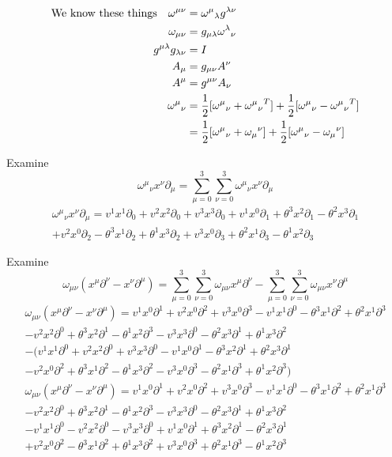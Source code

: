 \documentclass{article}
\begin{document}
\begin{align*}
	\qq*{We know these things}\omega^{\mu\nu}&={\omega^\mu}_\lambda g^{\lambda\nu}\\
	\omega_{\mu\nu}&= g_{\mu\lambda} {\omega^\lambda}_\nu\\
	g^{\mu\lambda}g_{\lambda\nu}&= I\\
	A_\mu&=g_{\mu\nu}A^\nu\\
	A^\mu&=g^{\mu\nu}A_\nu\\
	{\omega^\mu}_\nu&=\frac{1}{2}[{\omega^\mu}_\nu+{{\omega^\mu}_\nu}^T]+\frac{1}{2}[{\omega^\mu}_\nu-{{\omega^\mu}_\nu}^T]\\
	&=\frac{1}{2}[{\omega^\mu}_\nu+{\omega_\mu}^\nu]+\frac{1}{2}[{\omega^\mu}_\nu-{\omega_\mu}^\nu]
\end{align*}




Examine \[{\omega^\mu}_\nu x^\nu \partial_\mu=\sum^3_{\mu=0}\sum^3_{\nu=0}{\omega^\mu}_\nu x^\nu \partial_\mu\]
\begin{multline*}
{\omega^\mu}_\nu x^\nu \partial_\mu=
v^1 x^1 \partial_0+v^2 x^2 \partial_0+v^3 x^3 \partial_0+
v^1 x^0 \partial_1+\theta^3 x^2 \partial_1-\theta^2 x^3 \partial_1\\+ 
v^2 x^0 \partial_2-\theta^3 x^1 \partial_2+\theta^1 x^3 \partial_2+
v^3 x^0 \partial_3+\theta^2 x^1 \partial_3-\theta^1 x^2 \partial_3
\end{multline*}

Examine \[\omega_{\mu\nu} (x^\mu \partial^\nu-x^\nu \partial^\mu)=\sum^3_{\mu=0}\sum^3_{\nu=0}\omega_{\mu\nu} x^\mu \partial^\nu-\sum^3_{\mu=0}\sum^3_{\nu=0}\omega_{\mu\nu} x^\nu \partial^\mu\]
\begin{multline*}
\omega_{\mu\nu} (x^\mu \partial^\nu-x^\nu \partial^\mu)=
v^1 x^0 \partial^1+v^2 x^0 \partial^2+v^3 x^0 \partial^3
-v^1 x^1 \partial^0-\theta^3 x^1 \partial^2+\theta^2 x^1 \partial^3\\ 
-v^2 x^2 \partial^0+\theta^3 x^2 \partial^1-\theta^1 x^2 \partial^3
-v^3 x^3 \partial^0-\theta^2 x^3 \partial^1+\theta^1 x^3 \partial^2\\-
(v^1 x^1 \partial^0+v^2 x^2 \partial^0+v^3 x^3 \partial^0
-v^1 x^0 \partial^1-\theta^3 x^2 \partial^1+\theta^2 x^3 \partial^1\\ 
-v^2 x^0 \partial^2+\theta^3 x^1 \partial^2-\theta^1 x^3 \partial^2
-v^3 x^0 \partial^3-\theta^2 x^1 \partial^3+\theta^1 x^2 \partial^3)\end{multline*}
\begin{multline*}
\omega_{\mu\nu} (x^\mu \partial^\nu-x^\nu \partial^\mu)=
v^1 x^0 \partial^1+v^2 x^0 \partial^2+v^3 x^0 \partial^3
-v^1 x^1 \partial^0-\theta^3 x^1 \partial^2+\theta^2 x^1 \partial^3\\ 
-v^2 x^2 \partial^0+\theta^3 x^2 \partial^1-\theta^1 x^2 \partial^3
-v^3 x^3 \partial^0-\theta^2 x^3 \partial^1+\theta^1 x^3 \partial^2\\
-v^1 x^1 \partial^0-v^2 x^2 \partial^0-v^3 x^3 \partial^0
+v^1 x^0 \partial^1+\theta^3 x^2 \partial^1-\theta^2 x^3 \partial^1\\ 
+v^2 x^0 \partial^2-\theta^3 x^1 \partial^2+\theta^1 x^3 \partial^2
+v^3 x^0 \partial^3+\theta^2 x^1 \partial^3-\theta^1 x^2 \partial^3\end{multline*}
\end{document}
